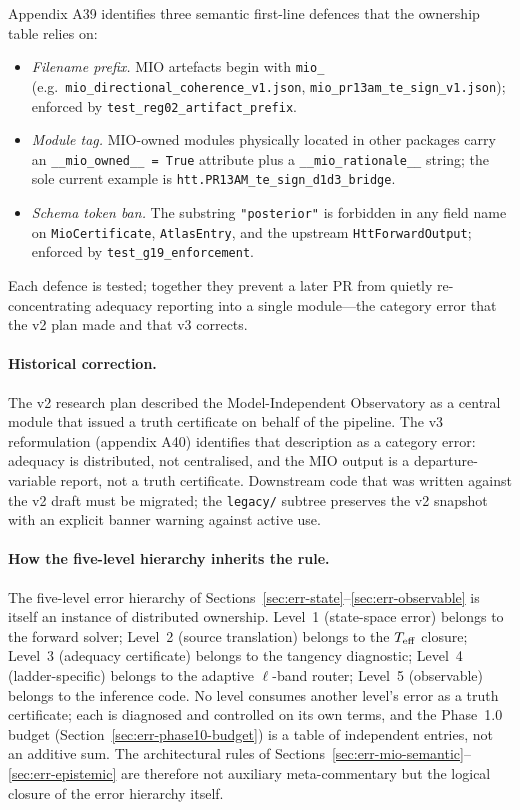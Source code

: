 Appendix A39 identifies three semantic first-line defences
that the ownership table relies on:

\begin{itemize}
\item \emph{Filename prefix.} MIO artefacts begin with
  \texttt{mio\_}
  (e.g.\ \texttt{mio\_directional\_coherence\_v1.json},
  \texttt{mio\_pr13am\_te\_sign\_v1.json}); enforced by
  \texttt{test\_reg02\_artifact\_prefix}.
\item \emph{Module tag.} MIO-owned modules physically
  located in other packages carry an
  \texttt{\_\_mio\_owned\_\_ = True} attribute plus a
  \texttt{\_\_mio\_rationale\_\_} string; the sole current
  example is
  \texttt{htt.PR13AM\_te\_sign\_d1d3\_bridge}.
\item \emph{Schema token ban.} The substring
  \texttt{"posterior"} is forbidden in any field name on
  \texttt{MioCertificate}, \texttt{AtlasEntry}, and the
  upstream \texttt{HttForwardOutput}; enforced by
  \texttt{test\_g19\_enforcement}.
\end{itemize}

Each defence is tested; together they prevent a later PR
from quietly re-concentrating adequacy reporting into a
single module---the category error that the v2 plan made
and that v3 corrects.


\paragraph{Historical correction.}

The v2 research plan described the Model-Independent
Observatory as a central module that issued a truth
certificate on behalf of the pipeline.  The v3 reformulation
(appendix A40) identifies that description as a category
error: adequacy is distributed, not centralised, and the MIO
output is a departure-variable report, not a truth
certificate.  Downstream code that was written against the
v2 draft must be migrated; the \texttt{legacy/} subtree
preserves the v2 snapshot with an explicit banner warning
against active use.


\paragraph{How the five-level hierarchy inherits the rule.}

The five-level error hierarchy of
Sections~\ref{sec:err-state}--\ref{sec:err-observable} is
itself an instance of distributed ownership.  Level~1
(state-space error) belongs to the forward solver; Level~2
(source translation) belongs to the $T_{\mathrm{eff}}$ closure;
Level~3 (adequacy certificate) belongs to the tangency
diagnostic; Level~4 (ladder-specific) belongs to the
adaptive $\ell$-band router; Level~5 (observable) belongs
to the inference code.  No level consumes another level's
error as a truth certificate; each is diagnosed and
controlled on its own terms, and the Phase~1.0 budget
(Section~\ref{sec:err-phase10-budget}) is a table of
independent entries, not an additive sum.  The
architectural rules of
Sections~\ref{sec:err-mio-semantic}--\ref{sec:err-epistemic}
are therefore not auxiliary meta-commentary but the
logical closure of the error hierarchy itself.
